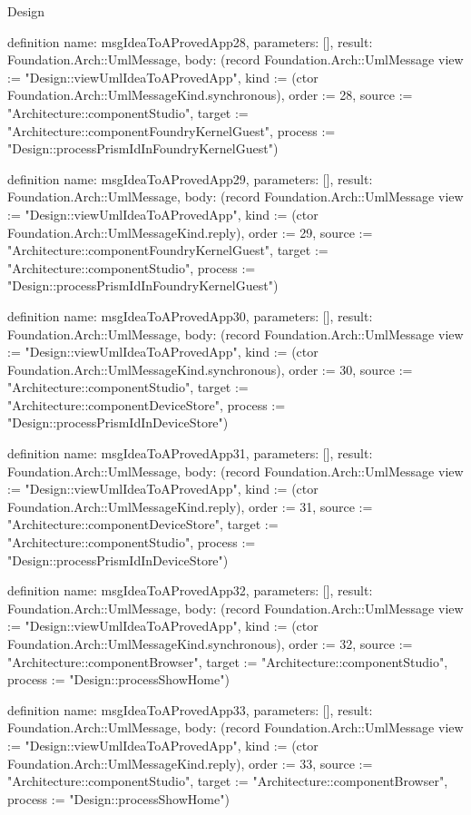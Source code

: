 \begin{lexlean}{Design}
\begin{semanticmodule}
definition{
  name: msgIdeaToAProvedApp28,
  parameters: [],
  result: Foundation.Arch::UmlMessage,
  body: (record Foundation.Arch::UmlMessage {view := "Design::viewUmlIdeaToAProvedApp", kind := (ctor Foundation.Arch::UmlMessageKind.synchronous), order := 28, source := "Architecture::componentStudio", target := "Architecture::componentFoundryKernelGuest", process := "Design::processPrismIdInFoundryKernelGuest"})
}

definition{
  name: msgIdeaToAProvedApp29,
  parameters: [],
  result: Foundation.Arch::UmlMessage,
  body: (record Foundation.Arch::UmlMessage {view := "Design::viewUmlIdeaToAProvedApp", kind := (ctor Foundation.Arch::UmlMessageKind.reply), order := 29, source := "Architecture::componentFoundryKernelGuest", target := "Architecture::componentStudio", process := "Design::processPrismIdInFoundryKernelGuest"})
}

definition{
  name: msgIdeaToAProvedApp30,
  parameters: [],
  result: Foundation.Arch::UmlMessage,
  body: (record Foundation.Arch::UmlMessage {view := "Design::viewUmlIdeaToAProvedApp", kind := (ctor Foundation.Arch::UmlMessageKind.synchronous), order := 30, source := "Architecture::componentStudio", target := "Architecture::componentDeviceStore", process := "Design::processPrismIdInDeviceStore"})
}

definition{
  name: msgIdeaToAProvedApp31,
  parameters: [],
  result: Foundation.Arch::UmlMessage,
  body: (record Foundation.Arch::UmlMessage {view := "Design::viewUmlIdeaToAProvedApp", kind := (ctor Foundation.Arch::UmlMessageKind.reply), order := 31, source := "Architecture::componentDeviceStore", target := "Architecture::componentStudio", process := "Design::processPrismIdInDeviceStore"})
}

definition{
  name: msgIdeaToAProvedApp32,
  parameters: [],
  result: Foundation.Arch::UmlMessage,
  body: (record Foundation.Arch::UmlMessage {view := "Design::viewUmlIdeaToAProvedApp", kind := (ctor Foundation.Arch::UmlMessageKind.synchronous), order := 32, source := "Architecture::componentBrowser", target := "Architecture::componentStudio", process := "Design::processShowHome"})
}

definition{
  name: msgIdeaToAProvedApp33,
  parameters: [],
  result: Foundation.Arch::UmlMessage,
  body: (record Foundation.Arch::UmlMessage {view := "Design::viewUmlIdeaToAProvedApp", kind := (ctor Foundation.Arch::UmlMessageKind.reply), order := 33, source := "Architecture::componentStudio", target := "Architecture::componentBrowser", process := "Design::processShowHome"})
}


\end{semanticmodule}
\end{lexlean}
